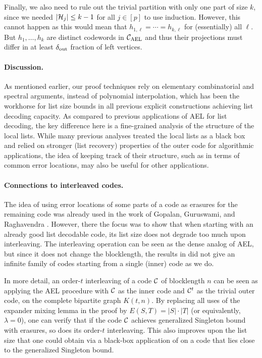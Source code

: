 
Finally, we also need to rule out the trivial partition with only one part of size $k$, since we needed $\lvert{\mathcal H}_j\rvert \leq k-1$ for all $j \in [p]$ to use induction. 
%
However, this cannot happen as this would mean that $h_{1,\ell} = \cdots = h_{k,\ell}$ for (essentially) all $\ell$. But $h_1, \ldots, h_k$ are distinct codewords in ${ {\mathcal C}_{\mathrm{AEL}} }$ and thus their
projections must differ in at least $\delta_{\mathrm{out}}$ fraction of left vertices.
%
\vspace{-5 pt}
\paragraph{Discussion.}
%
As mentioned earlier, our proof techniques rely on elementary combinatorial and spectral arguments,
instead of polynomial interpolation, which has been the workhorse for list size bounds in all
previous explicit constructions achieving list decoding capacity. 
%
As compared to previous applications of AEL for list decoding, the key difference here is a
fine-grained analysis of the structure of the local lists. 
%
While many previous analyses treated the local lists as a black box and relied on stronger (list
recovery) properties of the outer code for algorithmic applications, the idea of keeping track of
their structure, such as in terms of common error locations, may also be useful for other applications.

\vspace{-5 pt}
\paragraph{Connections to interleaved codes.}
%
The idea of using error locations of some parts of a code as erasures for the remaining code was already used in the work of Gopalan, Guruswami, and Raghavendra \cite{GGR09}. However, there the focus was to show that when starting with an already good list decodable code, its list size does not degrade too much upon interleaving. The interleaving operation can be seen as the dense analog of AEL, but since it does not change the blocklength, the results in \cite{GGR09} did not give an infinite family of codes starting from a single (inner) code as we do.

In more detail, an order-$t$ interleaving of a code ${\mathcal C}$ of blocklength $n$ can be seen as applying the AEL procedure with ${\mathcal C}$ as the inner code and ${\mathcal C}^t$ as the trivial outer code, on the complete bipartite graph $K(t,n)$. By replacing all uses of the expander mixing lemma in the proof by $E(S,T) = |S|\cdot |T|$ (or equivalently, $\lambda=0$), one can verify that if the code ${\mathcal C}$ achieves generalized Singleton bound with erasures, so does its order-$t$ interleaving. This also improves upon the list size that one could obtain via a black-box application of \cite{GGR09} on a code that lies close to the generalized Singleton bound.

